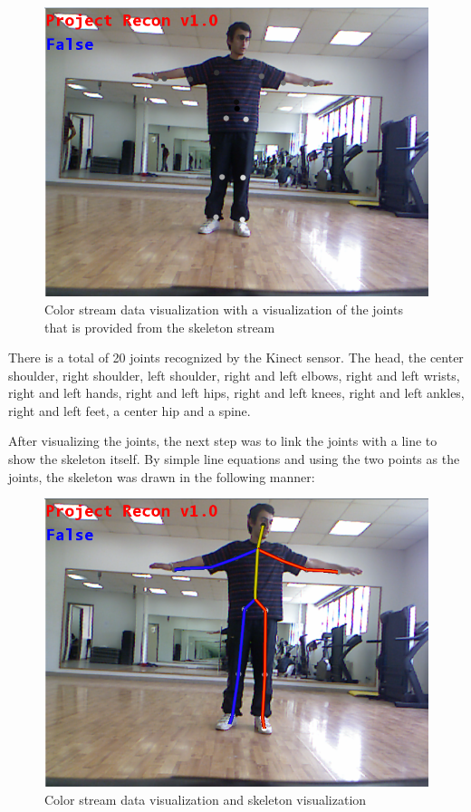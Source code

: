 \begin{figure}[!htbp]
\centering
\includegraphics[width=1\textwidth]{images/color_joints.png}
\caption{Color stream data visualization with a visualization of the joints that is provided from the skeleton stream}
\label{colorjoints}
\end{figure}

There is a total of 20 joints recognized by the Kinect sensor. The head, the center shoulder, right shoulder, left shoulder, right and left elbows, right and left wrists, right and left hands, right and left hips, right and left knees, right and left ankles, right and left feet, a center hip and a spine.

After visualizing the joints, the next step was to link the joints with a line to show the skeleton itself. By simple line equations and using the two points as the joints, the skeleton was drawn in the following manner:

\begin{figure}[!htbp]
\centering
\includegraphics[width=1\textwidth]{images/color_skeleton.png}
\caption{Color stream data visualization and skeleton visualization}
\label{colorskeleton}
\end{figure}

